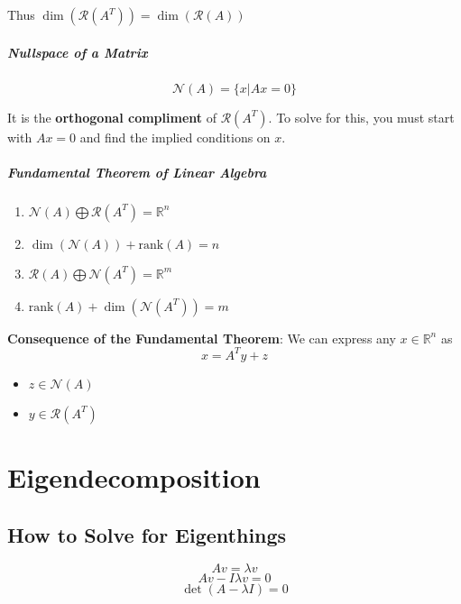 \documentclass[a4paper,12pt]{report}
\def\reals{\mathbb{R}}
\begin{document}
Thus $\dim(\mathcal{R}(A^T)) = \dim(\mathcal{R}(A))$


\paragraph{Nullspace of a Matrix} 

\begin{equation}
\mathcal{N}(A) = \{x|Ax = 0\}
\end{equation}

It is the \textbf{orthogonal compliment} of $\mathcal{R}(A^T)$. To solve for this, you must start with $Ax = 0$ and find the implied conditions on $x$.	

\paragraph{Fundamental Theorem of Linear Algebra} 
\begin{enumerate}
\item $\mathcal{N}(A) \bigoplus \mathcal{R}(A^T) = \reals^n$
\item $\dim(\mathcal{N}(A)) + \text{rank}(A) = n$
\item $\mathcal{R}(A) \bigoplus \mathcal{N}(A^T) = \reals^m$
\item $\text{rank}(A) + \dim(\mathcal{N}(A^T)) = m$
\end{enumerate}

\textbf{Consequence of the Fundamental Theorem}: We can express any $x\in\reals^n$ as \begin{equation}
x = A^T y + z
\end{equation}
\begin{itemize}
\item $z\in\mathcal{N}(A)$
\item $y\in\mathcal{R}(A^T)$
\end{itemize}


\chapter{Eigendecomposition} 

\section{How to Solve for Eigenthings}

$$Av = \lambda v$$
$$Av-I\lambda v = 0$$
\begin{equation}
\det(A - \lambda I) = 0
\end{equation}
\end{document}
